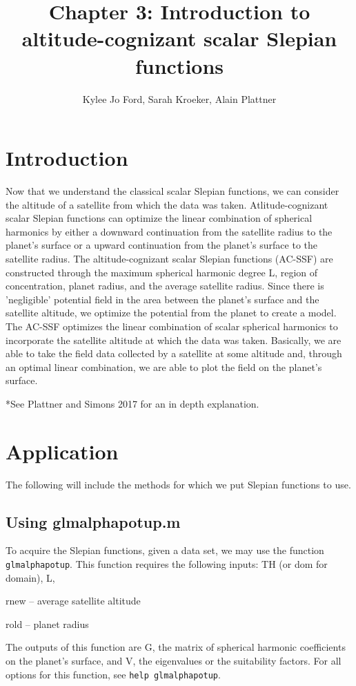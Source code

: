 \documentclass[11pt]{article}
\title{Chapter 3: Introduction to altitude-cognizant scalar Slepian functions}
\author{Kylee Jo Ford, Sarah Kroeker, Alain Plattner}
\begin{document}
\maketitle

\section{Introduction}

Now that we understand the classical scalar Slepian functions, we can consider the altitude of a satellite from which the data was taken.   Atlitude-cognizant scalar Slepian functions can optimize the linear combination of spherical harmonics by either a downward continuation from the satellite radius to the planet's surface or a upward continuation from the planet's surface to the satellite radius.  The altitude-cognizant scalar Slepian functions (AC-SSF) are constructed through the maximum spherical harmonic degree L, region of concentration, planet radius, and the average satellite radius.  Since there is 'negligible' potential field in the area between the planet's surface and the satellite altitude, we optimize the potential from the planet to create a model.  The AC-SSF optimizes the linear combination of scalar spherical harmonics to incorporate the satellite altitude at which the data was taken.  Basically, we are able to take the field data collected by a satellite at some altitude and, through an optimal linear combination, we are able to plot the field on the planet's surface. 

*See Plattner and Simons 2017 for an in depth explanation.

\section{Application}

The following will include the methods for which we put Slepian functions to use.  

\subsection{Using glmalphapotup.m}
To acquire the Slepian functions, given a data set, we may use the function \verb+glmalphapotup+.  This function requires the following inputs: TH (or dom for domain), L, 

rnew -- average satellite altitude

rold -- planet radius

The outputs of this function are G, the matrix of spherical harmonic coefficients on the planet's surface, and V, the eigenvalues or the suitability factors. For all options for this function, see \verb+help glmalphapotup+.  
\end{document}
